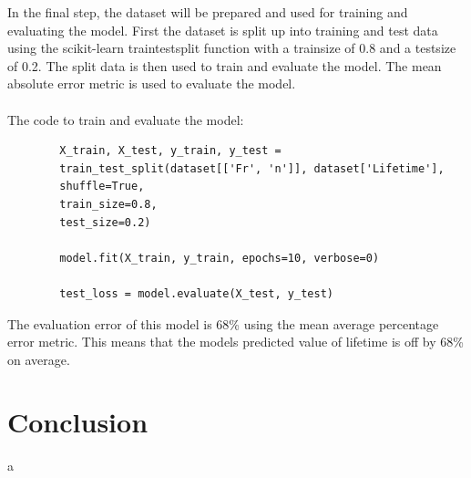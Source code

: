 \documentclass[letterpaper,10pt]{article}
\begin{document}
	In the final step, the dataset will be prepared and used for training and evaluating the model. First the dataset is split up into training and test data using the scikit-learn train\textunderscore test\textunderscore split function with a train\textunderscore size of 0.8 and a test\textunderscore size of 0.2. The split data is then used to train and evaluate the model. The mean absolute error metric is used to evaluate the model.
	\\ \\ The code to train and evaluate the model:
	\begin{lstlisting}
		X_train, X_test, y_train, y_test = 
		train_test_split(dataset[['Fr', 'n']], dataset['Lifetime'], 
		shuffle=True, 
		train_size=0.8, 
		test_size=0.2)
		
		model.fit(X_train, y_train, epochs=10, verbose=0)
		
		test_loss = model.evaluate(X_test, y_test)
	\end{lstlisting} 
	The evaluation error of this model is 68\% using the mean average percentage error metric. This means that the models predicted value of lifetime is off by 68\% on average.
	
	\section{Conclusion}
	a
	
	
	
	
	
	
	
	
	
	
	
	
	
	
	
	
	
	
	
	
	
	
	
	
	
	
	
	
	
	
	
	
	
\end{document}
